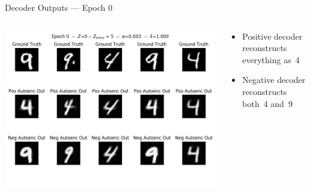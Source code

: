 \documentclass[11pt,dvipsnames,usenames,aspectratio=169]{beamer}  %
\newcommand{\red}[1]{{\color{red} #1}}
\begin{document}
\begin{frame}{Decoder Outputs --- Epoch \red{0}}
  \begin{columns}
    \begin{column}{0.59\textwidth}
      \begin{center}
        \includegraphics[scale=0.44]{deep-pu_epoch=000.jpg}
      \end{center}
    \end{column}
    \begin{column}{0.41\textwidth}
      \begin{itemize}[<+->]
        \setlength{\itemsep}{20pt}
        \item Positive decoder reconstructs everything as~4
        \item Negative decoder reconstructs both~4 and~9
      \end{itemize}
    \end{column}
  \end{columns}
\end{frame}
\end{document}
